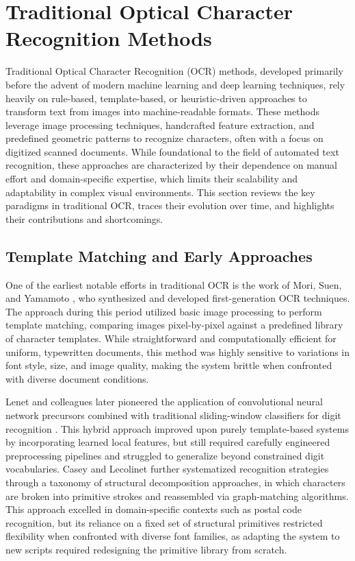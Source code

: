 \section{Traditional Optical Character Recognition Methods}

Traditional Optical Character Recognition (OCR) methods, developed primarily before the advent of modern machine learning and deep learning techniques, rely heavily on rule-based, template-based, or heuristic-driven approaches to transform text from images into machine-readable formats. These methods leverage image processing techniques, handcrafted feature extraction, and predefined geometric patterns to recognize characters, often with a focus on digitized scanned documents. While foundational to the field of automated text recognition, these approaches are characterized by their dependence on manual effort and domain-specific expertise, which limits their scalability and adaptability in complex visual environments. This section reviews the key paradigms in traditional OCR, traces their evolution over time, and highlights their contributions and shortcomings.

\subsection{Template Matching and Early Approaches}

One of the earliest notable efforts in traditional OCR is the work of Mori, Suen, and Yamamoto \cite{Mori1992}, who synthesized and developed first-generation OCR techniques. The approach during this period utilized basic image processing to perform template matching, comparing images pixel-by-pixel against a predefined library of character templates. While straightforward and computationally efficient for uniform, typewritten documents, this method was highly sensitive to variations in font style, size, and image quality, making the system brittle when confronted with diverse document conditions.

Lenet and colleagues later pioneered the application of convolutional neural network precursors combined with traditional sliding-window classifiers for digit recognition \cite{LeCun1998}. This hybrid approach improved upon purely template-based systems by incorporating learned local features, but still required carefully engineered preprocessing pipelines and struggled to generalize beyond constrained digit vocabularies. Casey and Lecolinet \cite{Casey1996} further systematized recognition strategies through a taxonomy of structural decomposition approaches, in which characters are broken into primitive strokes and reassembled via graph-matching algorithms. This approach excelled in domain-specific contexts such as postal code recognition, but its reliance on a fixed set of structural primitives restricted flexibility when confronted with diverse font families, as adapting the system to new scripts required redesigning the primitive library from scratch.

